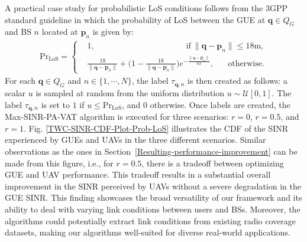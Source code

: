 A practical case study for probabilistic LoS conditions follows from the 3GPP standard guideline in which the probability of LoS between the GUE at $\bm{q} \in Q_G$ and BS $n$ located at $\bm{p}_n$ is given by:
\begin{align}\label{probability-LoS}
    \mathrm{Pr}_{\textrm{LoS}} = 
    \begin{cases}
    &\!\!\!\!\! 1,   \qquad\qquad\qquad\qquad\qquad\quad    \text{if}\ \| \bm{q} - \bm{p}_n \| \leq 18\textrm{m}, \\
    &\!\!\!\!\! \frac{18}{\| \bm{q} - \bm{p}_n \|} + \Big(1 - \frac{18}{\| \bm{q} - \bm{p}_n \|}\Big)e^{-\frac{\| \bm{q} - \bm{p}_n \|}{63}},   \quad\textrm{ } \text{otherwise}.
    \end{cases}
\end{align}
For each $\bm{q} \in Q_G$ and $n \in \{1, \cdots, N\}$, the label $\tau_{\bm{q}, n}$ is then created as follows: a scalar $u$ is sampled at random from the uniform distribution $u \sim \mathcal{U}[0, 1]$. The label $\tau_{\bm{q}, n}$ is set to $1$ if $u\leq \mathrm{Pr}_{\textrm{LoS}}$, and $0$ otherwise. Once labels are created, the Max-SINR-PA-VAT algorithm is executed for three scenarios: $r = 0$, $r = 0.5$, and $r = 1$. Fig. \ref{TWC-SINR-CDF-Plot-Prob-LoS} illustrates the CDF of the SINR experienced by GUEs and UAVs in the three different scenarios. Similar observations as the ones in Section~\ref{Resulting-performance-improvement} can be made from this figure, i.e., for $r = 0.5$, there is a tradeoff between optimizing GUE and UAV performance. This tradeoff results in a substantial overall improvement in the SINR perceived by UAVs without a severe degradation in the GUE SINR. %
This finding showcases the broad versatility of our framework and its ability to deal with varying link conditions between users and BSs. Moreover, the algorithms could potentially extract link conditions from existing radio coverage datasets, making our algorithms well-suited for diverse real-world applications.
